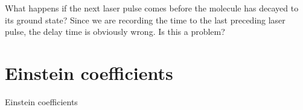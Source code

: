 \begin{questions}
  \item What happens if the next laser pulse comes before the molecule has decayed to its ground state? Since we are recording the time to the last preceding laser pulse, the delay time is obviously wrong. Is this a problem?
\end{questions}



\section{Einstein coefficients}

\begin{marginfigure}
  \caption{Einstein coefficients}
\end{marginfigure}



